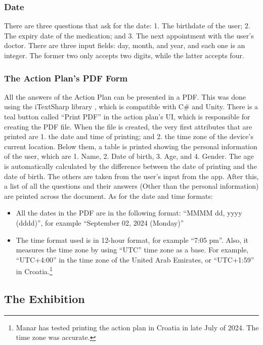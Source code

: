 \subsubsection*{Date}
There are three questions that ask for the date: 1. The birthdate of the user; 2. The expiry date of the medication; and 3. The next appointment with the user’s doctor. There are three input fields: day, month, and year, and each one is an integer. The former two only accepts two digits, while the latter accepts four.

\subsubsection*{The Action Plan’s PDF Form}
\label{ActionPlanPDF}
All the answers of the Action Plan can be presented in a PDF. This was done using the iTextSharp library \cite{iTextSharp}, which is compatible with C\# and Unity. There is a teal button called “Print PDF” in the action plan’s UI, which is responsible for creating the PDF file. When the file is created, the very first attributes that are printed are 1. the date and time of printing; and 2. the time zone of the device’s current location. Below them, a table is printed showing the personal information of the user, which are 1. Name, 2. Date of birth, 3. Age, and 4. Gender. The age is automatically calculated by the difference between the date of printing and the date of birth. The others are taken from the user’s input from the app. After this, a list of all the questions and their answers (Other than the personal information) are printed across the document. As for the date and time formats:
\begin{itemize}
    \item{All the dates in the PDF are in the following format: “MMMM dd, yyyy (dddd)”, for example “September 02, 2024 (Monday)”}
    
    \item{The time format used is in 12-hour format, for example “7:05 pm”. Also, it measures the time zone by using “UTC” time zone as a base. For example, “UTC+4:00” in the time zone of the United Arab Emirates, or “UTC+1:59” in Croatia.\footnote{Manar has tested printing the action plan in Croatia in late July of 2024. The time zone was accurate.}}
\end{itemize}

\subsection{The Exhibition}

